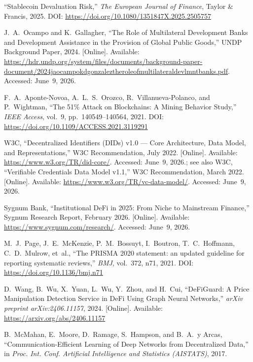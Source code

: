 \documentclass[12pt, a4paper]{report}
\begin{document}
{\begin{enumerate}[label={[\arabic*]}]
\item ``Stablecoin Devaluation Risk,'' \textit{The European Journal of Finance}, Taylor \& Francis, 2025. DOI: \url{https://doi.org/10.1080/1351847X.2025.2505757}

\item J.~A.~Ocampo and K.~Gallagher, ``The Role of Multilateral Development Banks and Development Assistance in the Provision of Global Public Goods,'' UNDP Background Paper, 2024. [Online]. Available: \url{https://hdr.undp.org/system/files/documents/background-paper-document/2024jaocampokdgonzaleztheroleofmultilateraldevlmntbanks.pdf}. Accessed: June~9, 2026.

\item F.~A.~Aponte-Novoa, A.~L.~S.~Orozco, R.~Villanueva-Polanco, and P.~Wightman, ``The 51\% Attack on Blockchains: A Mining Behavior Study,'' \textit{IEEE Access}, vol.~9, pp.~140549--140564, 2021. DOI: \url{https://doi.org/10.1109/ACCESS.2021.3119291}

\item W3C, ``Decentralized Identifiers (DIDs) v1.0 --- Core Architecture, Data Model, and Representations,'' W3C Recommendation, July 2022. [Online]. Available: \url{https://www.w3.org/TR/did-core/}. Accessed: June~9, 2026.; see also W3C, ``Verifiable Credentials Data Model v1.1,'' W3C Recommendation, March 2022. [Online]. Available: \url{https://www.w3.org/TR/vc-data-model/}. Accessed: June~9, 2026.

\item Sygnum Bank, ``Institutional DeFi in 2025: From Niche to Mainstream Finance,'' Sygnum Research Report, February 2026. [Online]. Available: \url{https://www.sygnum.com/research/}. Accessed: June~9, 2026.

\item M.~J.~Page, J.~E.~McKenzie, P.~M.~Bossuyt, I.~Boutron, T.~C.~Hoffmann, C.~D.~Mulrow, et~al., ``The PRISMA 2020 statement: an updated guideline for reporting systematic reviews,'' \textit{BMJ}, vol.~372, n71, 2021. DOI: \url{https://doi.org/10.1136/bmj.n71}

\item D.~Wang, B.~Wu, X.~Yuan, L.~Wu, Y.~Zhou, and H.~Cui, ``DeFiGuard: A Price Manipulation Detection Service in DeFi Using Graph Neural Networks,'' \textit{arXiv preprint arXiv:2406.11157}, 2024. [Online]. Available: \url{https://arxiv.org/abs/2406.11157}

\item B.~McMahan, E.~Moore, D.~Ramage, S.~Hampson, and B.~A.~y Arcas, ``Communication-Efficient Learning of Deep Networks from Decentralized Data,'' in \textit{Proc. Int. Conf. Artificial Intelligence and Statistics (AISTATS)}, 2017.


\end{enumerate}}
\end{document}
